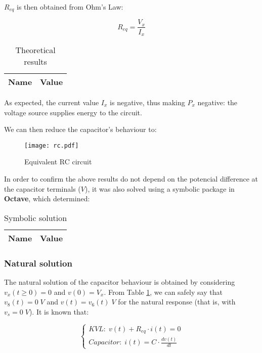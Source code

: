 $R_{eq}$ is then obtained from Ohm's Law:

\begin{equation}
  R_{eq} = \frac{V_x}{I_x}
\end{equation}

\begin{table}[H]
  \centering
  \begin{tabular}{|c|c|}
    \hline
        {\bf Name} & {\bf Value} \\
        \hline
        \hline
        
        \hline
  \end{tabular}
  \caption{Theoretical results}
\end{table}

As expected, the current value $I_x$ is negative, thus making $P_x$ negative: the voltage source supplies energy to the circuit.

We can then reduce the capacitor's behaviour to:

\begin{figure}[H]
  \centering
  \texttt{[image: rc.pdf]}
  \caption{Equivalent RC circuit}
  \label{rc_fig}
\end{figure}

In order to confirm the above results do not depend on the potencial difference at the capacitor terminals ($V$), it was also solved using a symbolic package in \textbf{Octave}, which determined:

\begin{table}[H]
  \centering
  \begin{tabular}{|c|c|}
    \hline
        {\bf Name} & {\bf Value} \\
        \hline
        \hline
        
        \hline
  \end{tabular}
  \label{sym}
  \caption{Symbolic solution}
\end{table}

\subsubsection{Natural solution}

The natural solution of the capacitor behaviour is obtained by considering $v_x(t\geq0)=0$ and $v(0)=V_x$. From Table \ref{sym}, we can safely say that $v_8(t)=0\;V$ and $v(t)=v_6(t)\;V$ for the natural response (that is, with $v_s=0\;V$). It is known that:

\begin{equation}
  \begin{cases}
    KVL:\; v(t) + R_{eq} \cdot i(t) = 0 \\
    Capacitor:\; i(t) = C \cdot \frac{dv(t)}{dt}
  \end{cases}
  \label{sis}
\end{equation}

